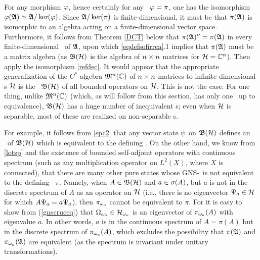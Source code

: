 For any morphism $\varphi$, hence certainly for any \rep\ $\varphi=\pi$, one
has the isomorphism $\varphi({\frak A})\simeq {\frak A}/\ker(\varphi)$. Since
${\frak A}/\ker(\pi)$ is finite-dimensional, it must be that $\pi({\frak A})$ is
isomorphic to an algebra acting on a finite-dimensional vector space.
Furthermore, it follows from Theorem \ref{DCT} below that
$\pi({\frak A})''=\pi({\frak A})$ in every finite-dimensional \rep\ of ${\frak A}$, upon
which \ref{eqdefsofirrca}.1 implies that $\pi({\frak A})$ must be a matrix
algebra (as ${\frak B}({\cal H})$ is the algebra of $n\times n$ matrices for
${\cal H}={\Bbb C}^n$). Then apply the isomorphism \ref{refdec}.  \enp {} It would appear that the appropriate
generalization of the $C^*$-algebra ${\frak M}^n({\Bbb C})$ of $n\times n$ matrices to
infinite-dimensional \Hs s ${\cal H}$ is the \ca\ ${\frak B}({\cal H})$ of all bounded
operators on ${\cal H}$. This is not the case. For one thing, unlike
${\frak M}^n({\Bbb C})$ (which, as will follow from this section, has only one
\irrep\ up to equivalence), ${\frak B}({\cal H})$ has a huge number of inequivalent
\rep s; even when ${\cal H}$ is separable, most of these are realized on
non-separable \Hs s.

 For example, it follows from \ref{spc2} that any vector state $\psi$
on ${\frak B}({\cal H})$ defines an \irrep\ of ${\frak B}({\cal H})$ which is equivalent to the
defining \rep. On the other hand, we know from \ref{lotsp} and the
existence of bounded self-adjoint operators with continuous spectrum
(such as any multiplication operator on $L^2(X)$, where $X$ is
connected), that there are many other pure states whose GNS-\rep\ is
not equivalent to the defining \rep\ $\pi$.  Namely, when $A\in{\frak B}({\cal H})$
and $a\in\sigma(A)$, but $a$ is not in the discrete spectrum of $A$ as an
operator on ${\cal H}$ (i.e., there is no eigenvector $\Psi_a\in{\cal H}$ for which
$A\Psi_a=a\Psi_a$), then $\pi_{\omega_a}$ cannot be equivalent to
$\pi$. For it is easy to show from (\ref{gnscruceq}) that
$\Omega_{\omega_a}\in{\cal H}_{\omega_a}$ is an eigenvector of $\pi_{\omega_a}(A)$ with
eigenvalue $a$. In other words, $a$ is in the continuous spectrum of
$A=\pi(A)$ but in the discrete spectrum of $\pi_{\omega_a}(A)$, which
excludes the possibility that $\pi({\frak A})$ and $\pi_{\omega_a}({\frak A})$ are
equivalent (as the spectrum is invariant under unitary
transformations).

